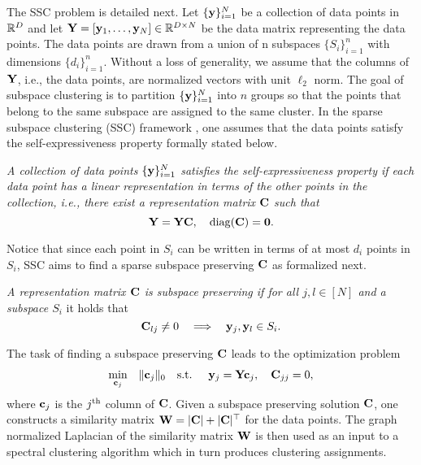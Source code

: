 The SSC problem is detailed next. Let $\{{\mathbf y}\}_{i=1}^N$ be a collection of data points in ${\mathbb{R}}^D$ and let ${\mathbf Y} = [{\mathbf y}_1,\dots,{\mathbf y}_N] \in {\mathbb{R}}^{D\times N}$ be the data matrix representing the data points. The data points are drawn from a union of n subspaces $\{S_i\}_{i=1}^n$ with dimensions $\{d_i\}_{i=1}^n$. Without a loss of generality, we assume that the columns of ${\mathbf Y}$, i.e., the data points, are normalized vectors with unit $\ell_2$ norm. The goal of subspace clustering is to partition $\{{\mathbf y}\}_{i=1}^N$ into $n$ groups so that the points that belong to the same subspace are assigned to the same cluster. In the sparse subspace clustering (SSC) framework \cite{elhamifar2009sparse}, one assumes that the data points satisfy the self-expressiveness property formally stated below.
\begin{definition}
\textit{A collection of data points $\{{\mathbf y}\}_{i=1}^N$ satisfies the self-expressiveness property if each data point has a linear representation in terms of the other points in the collection, i.e., there exist a representation matrix ${\mathbf C}$ such that}
\begin{equation}
{\mathbf Y} = {\mathbf Y} {\mathbf C}, \quad \mathrm{diag}({\mathbf C}) = \mathbf{0}.
\end{equation}
\end{definition}
Notice that since each point in $S_i$ can be
written in terms of at most $d_i$ points in $S_i$, SSC aims to find a sparse subspace preserving 
${\mathbf C}$ as formalized next.
\begin{definition}
\textit{A representation matrix ${\mathbf C}$ is subspace preserving if for all $j,l \in [N]$ and a 
subspace $S_i$} it holds that
\begin{equation}
{\mathbf C}_{lj} \neq 0 \quad \Longrightarrow \quad {\mathbf y}_j, {\mathbf y}_l \in S_i.
\end{equation}
\end{definition}
The task of finding a subspace preserving ${\mathbf C}$ leads to the optimization problem \cite{elhamifar2009sparse}
\begin{equation}\label{eq:prob}
\begin{aligned}
& \underset{{\mathbf c}_j}{\text{min}}
\quad \|{\mathbf c}_j\|_0
& \text{s.t.}\hspace{0.5cm}  {\mathbf y}_j = {\mathbf Y}{\mathbf c}_j, \quad {\mathbf C}_{jj} = 0,
\end{aligned}
\end{equation}
where ${\mathbf c}_j$ is the $j\textsuperscript{th}$ column of ${\mathbf C}$. Given a subspace
preserving solution ${\mathbf C}$, one constructs a similarity matrix ${\mathbf W} = |{\mathbf C}|+|{\mathbf C}|^\top$ for the data points. The graph normalized Laplacian of the similarity matrix ${\mathbf W}$ is then used as an input to a spectral clustering algorithm \cite{ng2001spectral} which in turn produces clustering assignments.